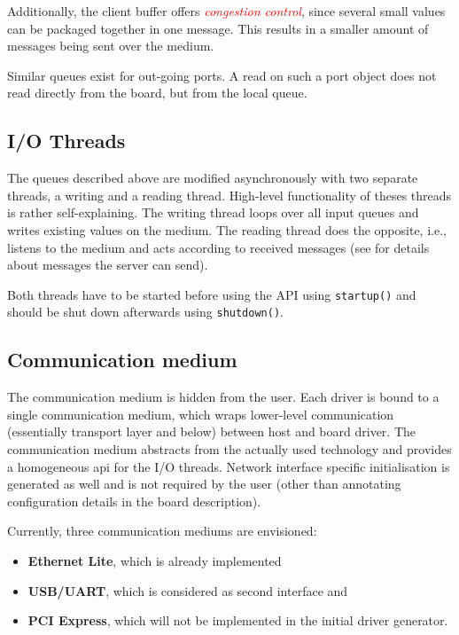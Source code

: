 \documentclass{report}
\begin{document}
Additionally, the client buffer offers \textcolor{red}{\textit{congestion control}}, since several small values can be packaged together in one message. This results in a smaller amount of messages being sent over the medium.

Similar queues exist for out-going ports. A read on such a port object does not read directly from the board, but from the local queue.

\subsection{I/O Threads}
The queues described above are modified asynchronously with two separate threads, a writing and a reading thread. High-level functionality of theses threads is rather self-explaining. The writing thread loops over all input queues and writes existing values on the medium. The reading thread does the opposite, i.e., listens to the medium and acts according to received messages (see  for details about messages the server can send).

Both threads have to be started before using the API using \texttt{startup()} and should be shut down afterwards using \texttt{shutdown()}.

\subsection{Communication medium}
The communication medium is hidden from the user. Each driver is bound to a single communication medium, which wraps lower-level communication (essentially transport layer and below) between host and board driver. The communication medium abstracts from the actually used technology and provides a homogeneous api for the I/O threads. Network interface specific initialisation is generated as well and is not required by the user (other than annotating configuration details in the board description).

Currently, three communication mediums are envisioned:
\begin{itemize} \itemsep1pt \parskip0pt 
\item \textbf{Ethernet Lite}, which is already implemented
\item \textbf{USB/UART}, which is considered as second interface and
\item \textbf{PCI Express}, which will not be implemented in the initial driver generator.
\end{itemize}
\end{document}
